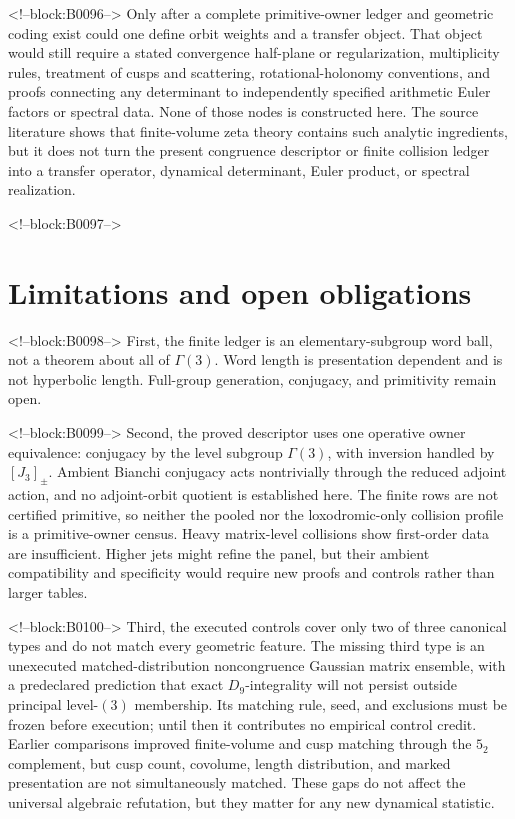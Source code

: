 \documentclass[11pt,a4paper]{article}
\theoremstyle{definition}
\theoremstyle{remark}
\begin{document}
<!--block:B0096-->
Only after a complete primitive-owner ledger and geometric coding exist could one define orbit weights and a transfer object. That object would still require a stated convergence half-plane or regularization, multiplicity rules, treatment of cusps and scattering, rotational-holonomy conventions, and proofs connecting any determinant to independently specified arithmetic Euler factors or spectral data. None of those nodes is constructed here. The source literature shows that finite-volume zeta theory contains such analytic ingredients, but it does not turn the present congruence descriptor or finite collision ledger into a transfer operator, dynamical determinant, Euler product, or spectral realization.

<!--block:B0097-->
\section{Limitations and open obligations}

<!--block:B0098-->
First, the finite ledger is an elementary-subgroup word ball, not a theorem about all of \(\Gamma(3)\). Word length is presentation dependent and is not hyperbolic length. Full-group generation, conjugacy, and primitivity remain open.

<!--block:B0099-->
Second, the proved descriptor uses one operative owner equivalence: conjugacy by the level subgroup \(\Gamma(3)\), with inversion handled by \([J_3]_{\pm}\). Ambient Bianchi conjugacy acts nontrivially through the reduced adjoint action, and no adjoint-orbit quotient is established here. The finite rows are not certified primitive, so neither the pooled nor the loxodromic-only collision profile is a primitive-owner census. Heavy matrix-level collisions show first-order data are insufficient. Higher jets might refine the panel, but their ambient compatibility and specificity would require new proofs and controls rather than larger tables.

<!--block:B0100-->
Third, the executed controls cover only two of three canonical types and do not match every geometric feature. The missing third type is an unexecuted matched-distribution noncongruence Gaussian matrix ensemble, with a predeclared prediction that exact \(D_9\)-integrality will not persist outside principal level-\((3)\) membership. Its matching rule, seed, and exclusions must be frozen before execution; until then it contributes no empirical control credit. Earlier comparisons improved finite-volume and cusp matching through the \(5_2\) complement, but cusp count, covolume, length distribution, and marked presentation are not simultaneously matched. These gaps do not affect the universal algebraic refutation, but they matter for any new dynamical statistic.
\end{document}
